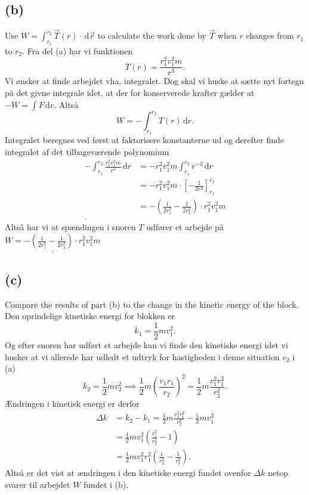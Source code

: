 \documentclass[12pt]{article}
\theoremstyle{definition}
\begin{document}
\subsection*{(b)}
Use $W = \int_{r_1}^{r_2} \Vec{T}(r) \cdot \, \mathrm{d}\Vec{r}$ to calculate the work done by $\Vec{T}$ when $r$ changes from $r_1$ to $r_2$.
\bigbreak
Fra del (a) har vi funktionen
\[ 
T(r) = \frac{r_1^2v_1^2m}{r^3}
.\]
Vi ønsker at finde arbejdet vha. integralet. Dog skal vi huske at sætte nyt fortegn på det givne integrale idet, at der for konserverede krafter gælder at $-W = \int F \, \mathrm{d}r$. Altså
\[ 
W = -\int_{r_1}^{r_2} T(r) \, \mathrm{d}r 
.\]
Integralet beregnes ved først at faktorisere konstanterne ud og derefter finde integralet af det tilbageværende polynomium
\begin{align*}
  -\int_{r_1}^{r_2} \frac{r_1^2v_1^2m}{r^3} \, \mathrm{d}r &= -r_1^2v_1^2m \int_{r_1}^{r_2} r^{-3} \, \mathrm{d}r \\
  &= -r_1^2v_1^2m \cdot \left[ -\frac{1}{2r^2} \right]_{r_1}^{r_2} \\
  &= -\left( \frac{1}{2r_1^2} - \frac{1}{2r_2^2} \right)\cdot r_1^2v_1^2m \\
.\end{align*}
Altså har vi at spændingen i snoren $T$ udfører et arbejde på $\underline{\underline{W = - \left( \frac{1}{2r_1^2} - \frac{1}{2r_2^2} \right) \cdot r_1^2v_1^2m }}$


\subsection*{(c)}
Compare the results of part (b) to the change in the kinetic energy of the block.
\bigbreak
Den oprindelige kinetiske energi for blokken er
\[ 
k_1 = \frac{1}{2}mv_1^2
.\]
Og efter snoren har udført et arbejde kan vi finde den kinetiske energi idet vi husker at vi allerede har udledt et udtryk for hastigheden i denne situation $v_2$ i (a)
\[ 
k_2 = \frac{1}{2}mv_2^2 \implies \frac{1}{2} m \left( \frac{v_1r_1}{r_2} \right)^2 = \frac{1}{2}m  \frac{v_1^2r_1^2}{r_2^2}
.\]
Ændringen i kinetisk energi er derfor
\begin{align*}
  \Delta k &= k_2 - k_1 = \frac{1}{2}m \frac{v_1^2r_1^2}{r_2^2} - \frac{1}{2}mv_1^2 \\
  &= \frac{1}{2}mv_1^2 \left( \frac{r_1^2}{r_2^2}-1 \right) \\
  &= \frac{1}{2}mv_1^2r_1^2 \left( \frac{1}{r_2^2} - \frac{1}{r_1^2} \right)
.\end{align*}
Altså er det vist at ændringen i den kinetiske energi fundet ovenfor $\Delta k$ netop svarer til arbejdet $W$ fundet i (b).
\end{document}

